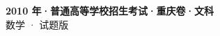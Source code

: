 \documentclass[zihao=-4, a4paper]{ctexart}
\begin{document}
\begin{center}
  {\Large\bfseries 2010 年·普通高等学校招生考试·重庆卷·文科}\\[4pt]
  {\large 数学 · 试题版}
\end{center}
\medskip
{}

\end{document}
